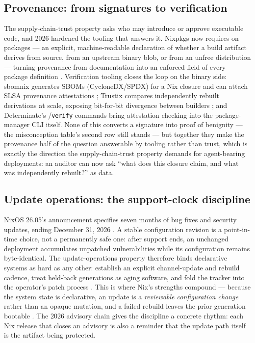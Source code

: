 \documentclass[
  english,
  9pt,
]{extarticle}
\begin{document}
\subsection{Provenance: from signatures to
verification}\label{provenance-from-signatures-to-verification}

The supply-chain-trust property asks who may introduce or approve
executable code, and 2026 hardened the tooling that answers it. Nixpkgs
now requires  on packages --- an explicit,
machine-readable declaration of whether a build artifact derives from
source, from an upstream binary blob, or from an unfree distribution ---
turning provenance from documentation into an enforced field of every
package definition \citep{nixpkgs_source_provenance}. Verification
tooling closes the loop on the binary side: sbomnix generates SBOMs
(CycloneDX/SPDX) for a Nix closure and can attach SLSA provenance
attestations \citep{sbomnix}; Trustix compares independently rebuilt
derivations at scale, exposing bit-for-bit divergence between builders
\citep{trustix_rebuilt}; and Determinate's
/\texttt{verify} commands bring
attestation checking into the package-manager CLI itself. None of this
converts a signature into proof of benignity --- the misconception
table's second row still stands --- but together they make the
provenance half of the question answerable by tooling rather than trust,
which is exactly the direction the supply-chain-trust property demands
for agent-bearing deployments: an auditor can now ask ``what does this
closure claim, and what was independently rebuilt?'' as data.

\subsection{Update operations: the support-clock
discipline}\label{update-operations-the-support-clock-discipline}

NixOS 26.05's announcement specifies seven months of bug fixes and
security updates, ending December 31, 2026
\citep{nixos_2605_announcement}. A stable configuration revision is a
point-in-time choice, not a permanently safe one: after support ends, an
unchanged deployment accumulates unpatched vulnerabilities while its
configuration remains byte-identical. The update-operations property
therefore binds declarative systems as hard as any other: establish an
explicit channel-update and rebuild cadence, treat held-back generations
as aging software, and fold the tracker into the operator's patch
process \citep{nixos_security_tracker, nixos_2605_announcement}. This is
where Nix's strengths compound --- because the system state is
declarative, an update is a \emph{reviewable configuration change}
rather than an opaque mutation, and a failed rebuild leaves the prior
generation bootable \citep{nixos_rebuild_wiki}. The 2026 advisory chain
gives the discipline a concrete rhythm: each Nix release that closes an
advisory is also a reminder that the update path itself is the artifact
being protected.
\end{document}
